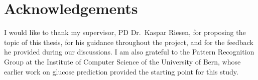\chapter*{Acknowledgements}

I would like to thank my supervisor, PD Dr.~Kaspar Riesen, for proposing the
topic of this thesis, for his guidance throughout the project, and for the
feedback he provided during our discussions. I am also grateful to the Pattern
Recognition Group at the Institute of Computer Science of the University of Bern,
whose earlier work on glucose prediction provided the starting point for this
study.
